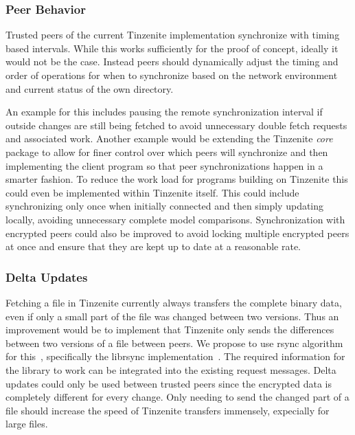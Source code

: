 \subsubsection{Peer Behavior}
\label{subs:Peer Behavior}

Trusted peers of the current Tinzenite implementation synchronize with timing based intervals.
While this works sufficiently for the proof of concept, ideally it would not be the case.
Instead peers should dynamically adjust the timing and order of operations for when to synchronize based on the network environment and current status of the own directory.

An example for this includes pausing the remote synchronization interval if outside changes are still being fetched to avoid unnecessary double fetch requests and associated work.
Another example would be extending the Tinzenite \emph{core} package to allow for finer control over which peers will synchronize and then implementing the client program so that peer synchronizations happen in a smarter fashion.
To reduce the work load for programs building on Tinzenite this could even be implemented within Tinzenite itself.
This could include synchronizing only once when initially connected and then simply updating locally, avoiding unnecessary complete model comparisons.
Synchronization with encrypted peers could also be improved to avoid locking multiple encrypted peers at once and ensure that they are kept up to date at a reasonable rate.

\subsubsection{Delta Updates}
\label{subs:Delta Updates}

Fetching a file in Tinzenite currently always transfers the complete binary data, even if only a small part of the file was changed between two versions.
Thus an improvement would be to implement that Tinzenite only sends the differences between two versions of a file between peers.
We propose to use rsync algorithm for this~\cite{tridgell1996rsync}, specifically the librsync implementation~\cite{web:site:librsync}.
The required information for the library to work can be integrated into the existing request messages.
Delta updates could only be used between trusted peers since the encrypted data is completely different for every change.
Only needing to send the changed part of a file should increase the speed of Tinzenite transfers immensely, expecially for large files.

